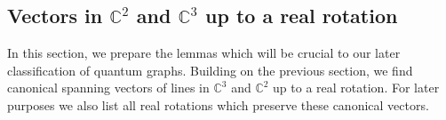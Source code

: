 \documentclass{amsart}
\newcommand{\C}{\mathbb{C}}
\DeclareMathOperator{\spann}{span}
\begin{document}



\subsection{Vectors in \texorpdfstring{$\C^2$}{C2} and \texorpdfstring{$\C^3$}{C3} up to a real rotation}
%
In this section, we prepare the lemmas which will be crucial to our later classification of quantum graphs. Building on the previous section, we find canonical spanning vectors of lines in $\C^3$ and $\C^2$ up to a real rotation.
For later purposes %
we also list all real rotations which preserve these canonical vectors.
\end{document}
